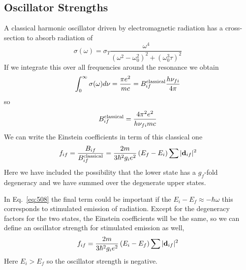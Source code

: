 \subsection{Oscillator Strengths}
\label{sec:oscillator-strengths}
A classical harmonic oscillator driven by electromagnetic radiation
has a cross-section to absorb radiation of 
\begin{equation}
\sigma(\omega) = \sigma_T \frac{\omega^4}{\left
  (\omega^2-\omega_0^2\right )^2+\left(\omega_0^3 \tau\right)^2}
\label{eq:529}
\end{equation}
If we integrate this over all frequencies around the resonance
we obtain
\begin{equation}
\int_0^\infty \sigma(\omega) d\nu = \frac{\pi e^2}{mc} =
B_{if}^{\hbox{\rm \scriptsize classical}} \frac{h\nu_{fi}}{4\pi}
\label{eq:530}
\end{equation}
so
\begin{equation}
B_{if}^{\hbox{\rm \scriptsize classical}} = \frac{4\pi^2 e^2}{h\nu_{fi} m c}
\label{eq:531}
\end{equation}
We can write the Einstein coefficients in term of this classical one
\begin{equation}
f_{if} = \frac{B_{if}}{B_{if}^{\hbox{\rm \scriptsize classical}}} = \frac{2 m }{3
  \hbar^2 g_i e^2} \left ( E_f - E_i \right )  \sum |{\bf d}_{if}|^2
\label{eq:532}
\end{equation}
Here we have included the possibility that the lower state has a
$g_f$-fold degeneracy and we have summed over the degenerate upper
states. 

In Eq.~\ref{eq:508} the final term could be important if the $E_i-E_f \approx
-\hbar \omega$ this corresponds to stimulated emission of radiation.
Except for the degeneracy factors for the two states, the Einstein
coefficients will be the same, so we can define an oscillator strength
for stimulated emission as well,
\begin{equation}
f_{if} = \frac{2 m}{3
  \hbar^2 g_i e^2} \left ( E_i - E_f \right )  \sum |{\bf d}_{if}|^2
\label{eq:533}
\end{equation}
Here $E_i > E_f$ so the oscillator strength is negative.

